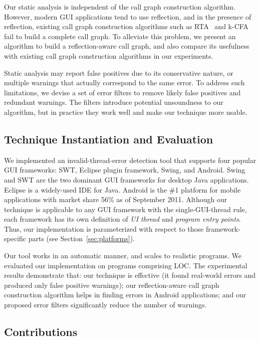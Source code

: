 Our static analysis is independent of the call graph construction algorithm.
However, modern GUI applications tend to use reflection, and
in the presence of reflection, existing call graph construction algorithms such as RTA~\cite{rta}
and k-CFA~\cite{kcfa} fail to build a complete call graph.
To alleviate this problem, we present an algorithm to build a reflection-aware call graph, and
also compare its usefulness with existing call graph construction algorithms in
our experiments.

Static analysis may report false positives due to its
conservative nature, or multiple warnings that actually correspond
to the same error. To address such limitations, we devise a set
 of error filters to remove likely false positives and redundant warnings.
The filters introduce potential unsoundness to our algorithm, but in practice
they work well and make our technique more usable.

\subsection{Technique Instantiation and Evaluation}


We implemented an invalid-thread-error detection tool that supports
four popular GUI frameworks: SWT, Eclipse plugin framework,
Swing, and Android. Swing and SWT are the
two dominant GUI frameworks for desktop Java applications.
Eclipse is a widely-used IDE for Java. Android is the \#1 platform for
mobile applications with market share 56\% as of September 2011.
Although our technique is applicable to any GUI
framework with the single-GUI-thread rule, each framework
has its own definition of \textit{UI thread} and \textit{program 
entry points}. Thus, our implementation is parameterized with respect to
those framework-specific parts (see Section~\ref{sec:platforms}).


Our tool works in an automatic manner,
and scales to realistic programs.
We evaluated our implementation on \subnum programs comprising \totaloc LOC.
The experimental results demonstrate
that: our technique is effective (it found \bugs real-world errors
 and produced only \falses false positive warnings);
our reflection-aware call graph construction algorithm helps in
finding errors in Android applications;
and our proposed error filters significantly reduce the number of warnings.


\subsection{Contributions}

